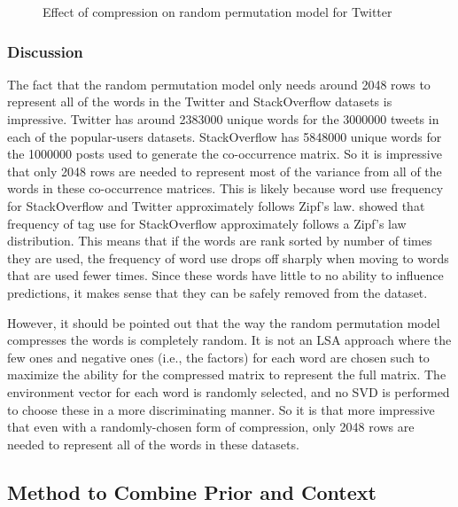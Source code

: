 \documentclass[man,floatsintext,donotrepeattitle]{apa6}
\begin{document}
\begin{figure}[!htbp]
  \caption{Effect of compression on random permutation model for Twitter}
  \label{figContextDimT}
\end{figure}

\subsubsection{Discussion}

The fact that the random permutation model only needs around \num{2048} rows to represent all of the words in the Twitter and StackOverflow datasets is impressive.
Twitter has around \num{2383000} unique words for the \num{3000000} tweets in each of the popular-users datasets.
StackOverflow has \num{5848000} unique words for the \num{1000000} posts used to generate the co-occurrence matrix.
So it is impressive that only \num{2048} rows are needed to represent most of the variance from all of the words in these co-occurrence matrices.
This is likely because word use frequency for StackOverflow and Twitter approximately follows Zipf's law.
\textcite{Stanley2013} showed that frequency of tag use for StackOverflow approximately follows a Zipf's law distribution.
This means that if the words are rank sorted by number of times they are used, the frequency of word use drops off sharply when moving to words that are used fewer times. 
Since these words have little to no ability to influence predictions, it makes sense that they can be safely removed from the dataset.

However, it should be pointed out that the way the random permutation model compresses the words is completely random.
It is not an LSA approach where the few ones and negative ones (i.e., the factors) for each word are chosen such to maximize the ability for the compressed matrix to represent the full matrix.
The environment vector for each word is randomly selected, and no SVD is performed to choose these in a more discriminating manner.
So it is that more impressive that even with a randomly-chosen form of compression, only \num{2048} rows are needed to represent all of the words in these datasets.

\subsection{Method to Combine Prior and Context}
\end{document}
